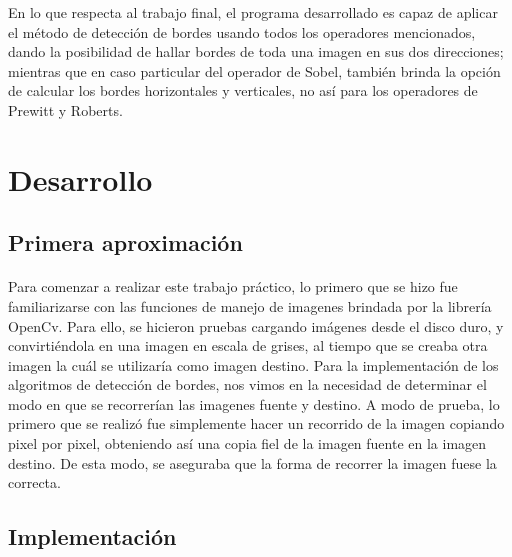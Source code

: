 \documentclass[11pt, a4paper]{article}
\begin{document}
En lo que respecta al trabajo final, el programa desarrollado es capaz de aplicar el m\'etodo de detecci\'on de bordes usando todos los operadores mencionados, dando la posibilidad de hallar bordes de toda una imagen en sus dos direcciones; mientras que en caso particular del operador de Sobel, tambi\'en brinda la opci\'on de calcular los bordes horizontales y verticales, no as\'i para los operadores de Prewitt y Roberts.

\newpage

\section{Desarrollo}

\subsection{Primera aproximaci\'on}
\paragraph{}
Para comenzar a realizar este trabajo pr\'actico, lo primero que se hizo fue familiarizarse con las funciones de manejo de imagenes brindada por la librer\'ia OpenCv. Para ello, se hicieron pruebas cargando im\'agenes desde el disco duro, y convirti\'endola en una imagen en escala de grises, al tiempo que se creaba otra imagen la cu\'al se utilizar\'ia como imagen destino.
Para la implementaci\'on de los algoritmos de detecci\'on de bordes, nos vimos en la necesidad de determinar el modo en que se recorrer\'ian las imagenes fuente y destino. A modo de prueba, lo primero que se realiz\'o fue simplemente hacer un recorrido de la imagen copiando pixel por pixel, obteniendo as\'i una copia fiel de la imagen fuente en la imagen destino. De esta modo, se aseguraba que la forma de recorrer la imagen fuese la correcta.

\subsection{Implementaci\'on}
\end{document}

